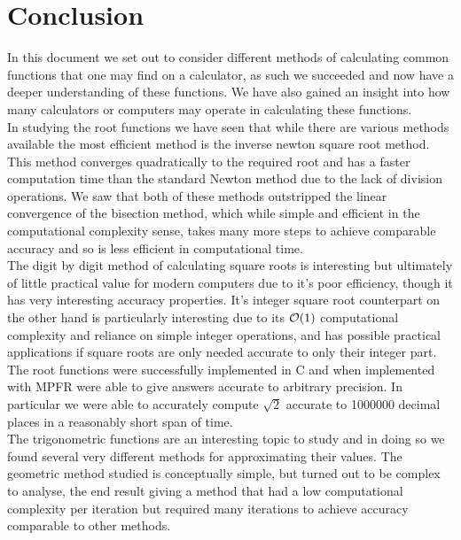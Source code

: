 \section{Conclusion}

In this document we set out to consider different methods of calculating common functions that one may find on a calculator, as such we succeeded and now have a deeper understanding of these functions. We have also gained an insight into how many calculators or computers may operate in calculating these functions.\\

In studying the root functions we have seen that while there are various methods available the most efficient method is the inverse newton square root method. This method converges quadratically to the required root and has a faster computation time than the standard Newton method due to the lack of division operations. We saw that both of these methods outstripped the linear convergence of the bisection method, which while simple and efficient in the computational complexity sense, takes many more steps to achieve comparable accuracy and so is less efficient in computational time.\\

The digit by digit method of calculating square roots is interesting but ultimately of little practical value for modern computers due to it's poor efficiency, though it has very interesting accuracy properties. It's integer square root counterpart on the other hand is particularly interesting due to its \(\mathcal{O}(1)\) computational complexity and reliance on simple integer operations, and has possible practical applications if square roots are only needed accurate to only their integer part.\\

The root functions were successfully implemented in C and when implemented with MPFR were able to give answers accurate to arbitrary precision. In particular we were able to accurately compute \(\sqrt{2}\) accurate to 1000000 decimal places in a reasonably short span of time.\\

The trigonometric functions are an interesting topic to study and in doing so we found several very different methods for approximating their values. The geometric method studied is conceptually simple, but turned out to be complex to analyse, the end result giving a method that had a low computational complexity per iteration but required many iterations to achieve accuracy comparable to other methods.\\

